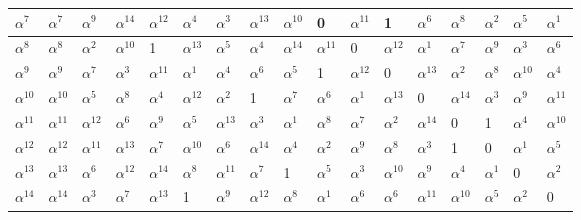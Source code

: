 \begin{table}[h!]
\begin{tabular}{|l|l|l|l|l|l|l|l|l|l|l|l|l|l|l|l|l|}
  $\alpha^7$ & $\alpha^7$ & $\alpha^9$ & $\alpha^{14}$ & $\alpha^{12}$ & $\alpha^4$ & $\alpha^3$ & $\alpha^{13}$ & $\alpha^{10}$ & 0 & $\alpha^{11}$ & 1 & $\alpha^6$ & $\alpha^8$ & $\alpha^2$ & $\alpha^5$ & $\alpha^1$\\
  \hline
  $\alpha^8$ & $\alpha^8$ & $\alpha^2$ & $\alpha^{10}$ & 1 & $\alpha^{13}$ & $\alpha^5$ & $\alpha^4$ & $\alpha^{14}$ & $\alpha^{11}$ & 0 & $\alpha^{12}$ & $\alpha^1$& $\alpha^7$ & $\alpha^9$ & $\alpha^3$ & $\alpha^6$ \\
  \hline
  $\alpha^9$ & $\alpha^9$ & $\alpha^7$ & $\alpha^3$ & $\alpha^{11}$ & $\alpha^1$& $\alpha^4$ & $\alpha^6$ & $\alpha^5$ & 1 & $\alpha^{12}$ & 0 & $\alpha^{13}$ & $\alpha^2$ & $\alpha^8$ & $\alpha^{10}$ & $\alpha^4$ \\
  \hline
  $\alpha^{10}$ & $\alpha^{10}$ & $\alpha^5$ & $\alpha^8$ & $\alpha^4$ & $\alpha^{12}$ & $\alpha^2$ & 1 & $\alpha^7$ & $\alpha^6$ & $\alpha^1$& $\alpha^{13}$ & 0 & $\alpha^{14}$ & $\alpha^3$ & $\alpha^9$ & $\alpha^{11}$ \\
  \hline
  $\alpha^{11}$ & $\alpha^{11}$ & $\alpha^{12}$ & $\alpha^6$ & $\alpha^9$ & $\alpha^5$ & $\alpha^{13}$ & $\alpha^3$ & $\alpha^1$& $\alpha^8$ & $\alpha^7$ & $\alpha^2$ & $\alpha^{14}$ & 0 & 1 & $\alpha^4$ & $\alpha^{10}$ \\
  \hline
  $\alpha^{12}$ & $\alpha^{12}$ & $\alpha^{11}$ & $\alpha^{13}$ & $\alpha^7$ & $\alpha^{10}$ & $\alpha^6$ & $\alpha^{14}$ & $\alpha^4$ & $\alpha^2$ & $\alpha^9$ & $\alpha^8$ & $\alpha^3$ & 1 & 0 & $\alpha^1$& $\alpha^5$ \\
  \hline
  $\alpha^{13}$ & $\alpha^{13}$ & $\alpha^6$ & $\alpha^{12}$ & $\alpha^{14}$ & $\alpha^8$ & $\alpha^{11}$ & $\alpha^7$ & 1 & $\alpha^5$ & $\alpha^3$ & $\alpha^{10}$ & $\alpha^9$ & $\alpha^4$ & $\alpha^1$& 0 & $\alpha^2$ \\
  \hline
  $\alpha^{14}$ & $\alpha^{14}$ & $\alpha^3$ & $\alpha^7$ & $\alpha^{13}$ & 1 & $\alpha^9$ & $\alpha^{12}$ & $\alpha^8$ & $\alpha^1$& $\alpha^6$ & $\alpha^6$ & $\alpha^{11}$ & $\alpha^{10}$ & $\alpha^5$ & $\alpha^2$ & 0 \\
  \hline
\end{tabular}
\label{tab:slogenie_gf16}
\end{table}
\normalsize
